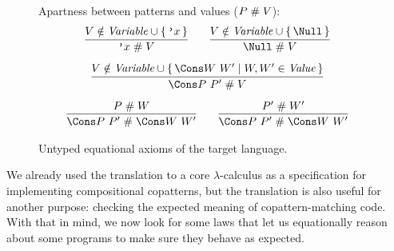 \begin{figure}[t!]

Apartness between patterns and values ($P \mathrel{\#} V$):
\begin{gather*}
  \infer
  {\q{x} \apart V}
  {V \notin \mathit{Variable} \cup \set{\q{x}}}
  \qquad
  \infer
  {\Null \apart V}
  {V \notin \mathit{Variable} \cup \set{\Null}}
  \\[1ex]
  \infer
  {\Cons P ~ P' \apart V}
  {V \notin \mathit{Variable} \cup \set{\Cons W ~ W' \mid W, W' \in \mathit{Value}}}
  \\[1ex]
  \infer
  {\Cons P ~ P' \apart \Cons W ~ W'}
  {P \apart W}
  \qquad
  \infer
  {\Cons P ~ P' \apart \Cons W ~ W'}
  {P' \apart W'}
\end{gather*}

\caption{Untyped equational axioms of the target language.}
\label{fig:target-equality}
\end{figure}

We already used the translation to a core $\lambda$-calculus as a specification for implementing compositional copatterns, but the translation is also useful for another purpose: checking the expected meaning of copattern-matching code.
With that in mind, we now look for some laws that let us equationally reason about some programs to make sure they behave as expected.

